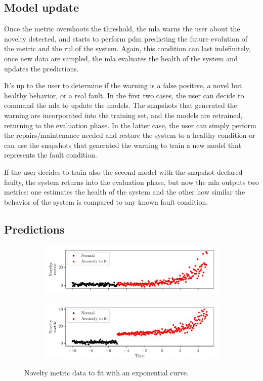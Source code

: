 \subsection{Model update}
Once the metric overshoots the threshold, the \gls{mla} warns the user about the novelty detected, and starts to perform \gls{pdm} predicting the future evolution of the metric and the \gls{rul} of the system. 
Again, this condition can last indefinitely, once new data are sampled, the \gls{mla} evaluates the health of the system and updates the predictions.

It's up to the user to determine if the warning is a false positive, a novel but healthy behavior, or a real fault. In the first two cases, the user can decide to command the \gls{mla} to update the models. The snapshots that generated the warning are incorporated into the training set, and the models are retrained, returning to the evaluation phase. In the latter case, the user can simply perform the repairs/maintenance needed and restore the system to a healthy condition or can use the snapshots that generated the warning to train a new model that represents the fault condition.

If the user decides to train also the second model with the snapshot declared faulty, the system returns into the evaluation phase, but now the \gls{mla} outputs two metrics: one estimates the health of the system and the other how similar the behavior of the system is compared to any known fault condition.

\subsection{Predictions}
\begin{figure}
    \centering
    \begin{subfigure}{\textwidth}
        \includegraphics[width=\linewidth]{images/Framework/EXP_1.pdf}
        \caption{}
        \label{fig:exp_degradation_1}
    \end{subfigure}
    \begin{subfigure}{\textwidth}
        \includegraphics[width=\linewidth]{images/Framework/EXP_2.pdf}
        \caption{}
        \label{fig:exp_degradation_2}
    \end{subfigure}
    \caption{Novelty metric data to fit with an exponential curve.}
    \label{fig:mainfig}
    \label{fig:exp_degradation}
\end{figure}

